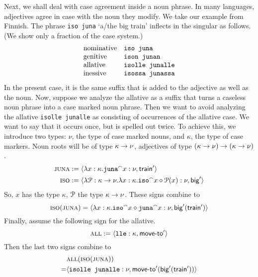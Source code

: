 Next, we shall deal with case agreement inside a noun phrase. In 
many languages, adjectives agree in case with the noun they modify. 
We take our example from Finnish. 
The phrase {\tt iso juna} `a/the big train' inflects in the 
singular as follows. (We show only a fraction of the case system.)
\begin{equation}
\begin{array}{lll}
\mbox{\rm nominative} & \mbox{\tt iso juna} \\
\mbox{\rm genitive}   & \mbox{\tt ison junan} \\
\mbox{\rm allative}   & \mbox{\tt isolle junalle} \\
\mbox{\rm inessive}   & \mbox{\tt isossa junassa}
\end{array}
\end{equation}
In the present case, it is the same suffix that is added to the
adjective as well as the noun. Now, suppose we analyze the allative
as a suffix that turns a caseless noun phrase into a case marked
noun phrase. Then we want to avoid analyzing the allative
{\tt isolle junalle} as consisting of occurrences of the allative
case. We want to say that it occurs once, but is spelled out twice.
To achieve this, we introduce two types: $\nu$, the type of 
case marked nouns, and $\kappa$, the type of case markers. 
Noun roots will be of type $\kappa \rightarrow \nu$, adjectives of type 
$(\kappa \rightarrow \nu) \rightarrow (\kappa \rightarrow \nu)$. 
\begin{align}
\mbox{\sc juna} & := \langle \lambda x : \kappa.\mbox{\tt juna}{^{\smallfrown}} x : \nu, 
	\mbox{\sf train}'\rangle \\
\mbox{\sc iso} & := \langle \lambda \mathcal{P} : \kappa\rightarrow\nu. \lambda x : \kappa. 
	\mbox{\tt iso} {^{\smallfrown}} x \diamond \mathcal{P}(x) : \nu, \mbox{\sf big}'\rangle
\end{align}
So, $x$ has the type $\kappa$, $\mathcal{P}$ the type $\kappa \rightarrow \nu$. 
These signs combine to 
\begin{equation}
\mbox{\sc iso}(\mbox{\sc juna}) =
\langle \lambda x : \kappa.\mbox{\tt iso}{^{\smallfrown}} x \diamond \mbox{\tt juna} {^{\smallfrown}} x 
	: \nu, \mbox{\sf big}'(\mbox{\sf train}')\rangle
\end{equation}
Finally, assume the following sign for the allative.
\begin{equation}
\mbox{\sc all} := \langle \mbox{\tt lle} : \kappa, \mbox{\sf move-to}'\rangle
\end{equation}
Then the last two signs combine to
\begin{align}
 & \mbox{\sc all}(\mbox{\sc iso}(\mbox{\sc juna})) \\\notag 
= & \auf \mbox{\tt isolle junalle}: \nu, \mbox{\sf move-to}'%
(\mbox{\sf big}'(\mbox{\sf train}'))\zu
\end{align}
